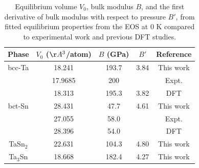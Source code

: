 \newpage
\begin{table}[H]
	\caption{Equilibrium volume $V_{0}$, bulk modulus $B$, and the first derivative of bulk modulus with respect to pressure $B'$, from fitted equilibrium properties from the EOS at 0 K compared to experimental work and previous DFT studies.}
	\centering
	\begin{tabular}{ c c c c c }
		\hline
		Phase & $V_{0}$ ($\AA^3$/atom) & $B$ (GPa) & $B'$ & Reference\\
		\hline
		bcc-Ta & 18.241 & 193.7 & 3.84 & This work\\
		            & 17.9685 & 200 &  & Expt. \cite{Predmore1970}\\
		            & 18.313 & 195.3 & 3.82 & DFT \cite{Shang2010b}\\
	    bct-Sn & 28.431 & 47.7 & 4.61 & This work\\
	               & 27.055 & 58.0 & & Expt. \cite{PeltzeryBlanca1993a}\\
	               & 28.396 & 54.0 & & DFT \cite{PeltzeryBlanca1993a}\\
	 TaSn$_2$ & 22.631 & 104.3 & 4.80 & This work\\
	 Ta$_3$Sn & 18.668 & 182.4 & 4.27 & This work\\
		\hline
	\end{tabular}
	\label{Ch4-table:TaSnvolume}
\end{table}
\clearpage

